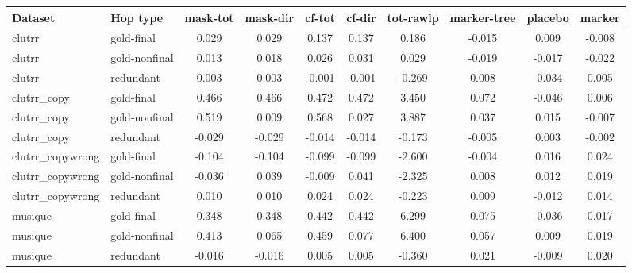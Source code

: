 \begin{tabular}{llcccccccc}
\toprule
Dataset & Hop type & mask-tot & mask-dir & cf-tot & cf-dir & tot-rawlp & marker-tree & placebo & marker \\
\midrule
clutrr & gold-final & 0.029 & 0.029 & 0.137 & 0.137 & 0.186 & -0.015 & 0.009 & -0.008 \\
clutrr & gold-nonfinal & 0.013 & 0.018 & 0.026 & 0.031 & 0.029 & -0.019 & -0.017 & -0.022 \\
clutrr & redundant & 0.003 & 0.003 & -0.001 & -0.001 & -0.269 & 0.008 & -0.034 & 0.005 \\
clutrr\_copy & gold-final & 0.466 & 0.466 & 0.472 & 0.472 & 3.450 & 0.072 & -0.046 & 0.006 \\
clutrr\_copy & gold-nonfinal & 0.519 & 0.009 & 0.568 & 0.027 & 3.887 & 0.037 & 0.015 & -0.007 \\
clutrr\_copy & redundant & -0.029 & -0.029 & -0.014 & -0.014 & -0.173 & -0.005 & 0.003 & -0.002 \\
clutrr\_copywrong & gold-final & -0.104 & -0.104 & -0.099 & -0.099 & -2.600 & -0.004 & 0.016 & 0.024 \\
clutrr\_copywrong & gold-nonfinal & -0.036 & 0.039 & -0.009 & 0.041 & -2.325 & 0.008 & 0.012 & 0.019 \\
clutrr\_copywrong & redundant & 0.010 & 0.010 & 0.024 & 0.024 & -0.223 & 0.009 & -0.012 & 0.014 \\
musique & gold-final & 0.348 & 0.348 & 0.442 & 0.442 & 6.299 & 0.075 & -0.036 & 0.017 \\
musique & gold-nonfinal & 0.413 & 0.065 & 0.459 & 0.077 & 6.400 & 0.057 & 0.009 & 0.019 \\
musique & redundant & -0.016 & -0.016 & 0.005 & 0.005 & -0.360 & 0.021 & -0.009 & 0.020 \\
\bottomrule
\end{tabular}
